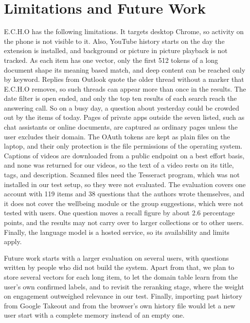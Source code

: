 \documentclass[conference]{IEEEtran}
\begin{document}
\section{Limitations and Future Work}\label{sec:limits}
E.C.H.O has the following limitations. It targets desktop Chrome, so activity on the phone is not visible to it. Also, YouTube history starts on the day the extension is installed, and background or picture in picture playback is not tracked. As each item has one vector, only the first 512 tokens of a long document shape its meaning based match, and deep content can be reached only by keyword. Replies from Outlook quote the older thread without a marker that E.C.H.O removes, so such threads can appear more than once in the results. The date filter is open ended, and only the top ten results of each search reach the answering call. So on a busy day, a question about yesterday could be crowded out by the items of today. Pages of private apps outside the seven listed, such as chat assistants or online documents, are captured as ordinary pages unless the user excludes their domain. The OAuth tokens are kept as plain files on the laptop, and their only protection is the file permissions of the operating system. Captions of videos are downloaded from a public endpoint on a best effort basis, and none was returned for our videos, so the text of a video rests on its title, tags, and description. Scanned files need the Tesseract program, which was not installed in our test setup, so they were not evaluated. The evaluation covers one account with 119 items and 38 questions that the authors wrote themselves, and it does not cover the wellbeing module or the group suggestions, which were not tested with users. One question moves a recall figure by about 2.6 percentage points, and the results may not carry over to larger collections or to other users. Finally, the language model is a hosted service, so its availability and limits apply.

Future work starts with a larger evaluation on several users, with questions written by people who did not build the system. Apart from that, we plan to store several vectors for each long item, to let the domain table learn from the user's own confirmed labels, and to revisit the reranking stage, where the weight on engagement outweighed relevance in our test. Finally, importing past history from Google Takeout and from the browser's own history file would let a new user start with a complete memory instead of an empty one.
\end{document}
